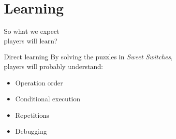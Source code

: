 \documentclass{beamer}
\newcommand{\rawgamename}{Sweet Switches}
\newcommand{\itgamename}{\emph{\rawgamename}}
\begin{document}
\section{Learning}
    \begin{frame}{}
        \centering
        \huge
        So what we expect\\players will learn?
    \end{frame}

    \begin{frame}{Direct learning}
        \centering
        By solving the puzzles in \itgamename,\\
        players will probably understand:\\[2em]

        \begin{minipage}{0.5\textwidth}
            \begin{itemize}
                \item Operation order\\[1em]
                \item Conditional execution\\[1em]
                \item Repetitions\\[1em]
                \item Debugging
            \end{itemize}
        \end{minipage}
    \end{frame}
\end{document}
